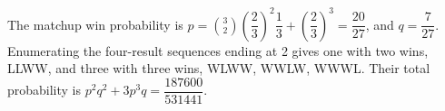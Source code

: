 The matchup win probability is $p=\binom32(\dfrac{2}{3})^2\dfrac{1}{3}+(\dfrac{2}{3})^3=\dfrac{20}{27}$, and $q=\dfrac{7}{27}$. Enumerating the four-result sequences ending at 2 gives one with two wins, LLWW, and three with three wins, WLWW, WWLW, WWWL. Their total probability is $p^2q^2+3p^3q=\boxed{\dfrac{187600}{531441}}$.
